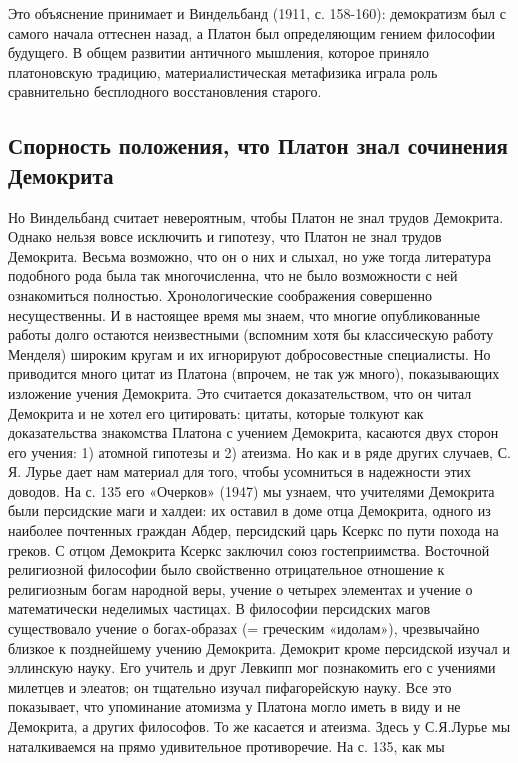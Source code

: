 Это объяснение принимает и Виндельбанд (1911, с. 158-160): демократизм
был с самого начала оттеснен назад, а Платон был определяющим гением
философии будущего. В общем развитии античного мышления, которое
приняло платоновскую традицию, материалистическая метафизика играла
роль сравнительно бесплодного восстановления старого.

\subsection{Спорность положения, что Платон знал сочинения Демокрита}

Но Виндельбанд считает невероятным, чтобы Платон не знал трудов
Демокрита. Однако нельзя вовсе исключить и гипотезу, что Платон не
знал трудов Демокрита. Весьма возможно, что он о них и слыхал, но уже
тогда литература подобного рода была так многочисленна, что не было
возможности с ней ознакомиться полностью. Хронологические соображения
совершенно несущественны. И в настоящее время мы знаем, что многие
опубликованные работы долго остаются неизвестными (вспомним хотя бы
классическую работу Менделя) широким кругам и их игнорируют
добросовестные специалисты. Но приводится много цитат из Платона
(впрочем, не так уж много), показывающих изложение учения Демокрита.
Это считается доказательством, что он читал Демокрита и не хотел его
цитировать: цитаты, которые толкуют как доказательства знакомства
Платона с учением Демокрита, касаются двух сторон его учения: 1)
атомной гипотезы и 2) атеизма. Но как и в ряде других случаев, С. Я.
Лурье дает нам материал для того, чтобы усомниться в надежности этих
доводов. На с. 135 его «Очерков» (1947) мы узнаем, что учителями
Демокрита были персидские маги и халдеи: их оставил в доме отца
Демокрита, одного из наиболее почтенных граждан Абдер, персидский царь
Ксеркс по пути похода на греков. С отцом Демокрита Ксеркс заключил
союз гостеприимства. Восточной религиозной философии было свойственно
отрицательное отношение к религиозным богам народной веры, учение о
четырех элементах и учение о математически неделимых частицах. В
философии персидских магов существовало учение о богах-образах (=
греческим «идолам»), чрезвычайно близкое к позднейшему учению
Демокрита. Демокрит кроме персидской изучал и эллинскую науку. Его
учитель и друг Левкипп мог познакомить его с учениями милетцев и
элеатов; он тщательно изучал пифагорейскую науку. Все это показывает,
что упоминание атомизма у Платона могло иметь в виду и не Демокрита, а
других философов. То же касается и атеизма. Здесь у С.Я.Лурье мы
наталкиваемся на прямо удивительное противоречие. На с. 135, как мы
